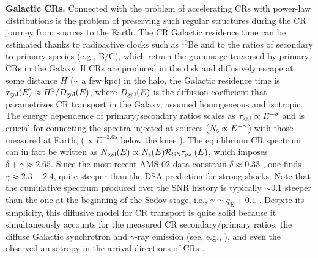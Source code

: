 \documentclass[varenna]{cimento}
\begin{document}
 {\bf Galactic CRs.}
Connected with the problem of accelerating CRs with power-law distributions is the problem of preserving such regular structures during the CR journey from sources to the Earth.
The CR Galactic residence time can be estimated thanks to radioactive clocks such as $^{10}$Be and to the   ratios of secondary to primary species  (e.g.,  B/C), which return the grammage traversed by primary CRs in the Galaxy.
If CRs are produced in the disk and diffusively escape at some distance $H$ ($\sim$\,a few kpc) in the halo, the Galactic residence time is $\tau_{\rm gal}(E)\approx H^2/D_{\rm gal}(E)$, where $D_{\rm gal}(E)$ is the diffusion coefficient that parametrizes CR transport in the Galaxy, assumed homogeneous and isotropic.
The energy dependence of primary/secondary ratios scales as $\tau_{\rm gal}\propto E^{-\delta}$ and is crucial for connecting the spectra injected at sources ($N_{\rm s}\propto E^{-\gamma}$) with those measured at Earth, ($\propto E^{-2.65}$ below the knee \cite{PAMELA14,ams16a}).
The equilibrium CR spectrum can in fact be written as $N_{\rm gal}(E)\propto N_{\rm s}(E) \mathcal{R_{\rm SN}}\tau_{\rm gal}(E)$, which imposes $\delta+\gamma\approx 2.65$.
Since the most recent AMS-02 data constrain $\delta\approx 0.33$  \cite{ams16a,evoli+21}, one finds $\gamma\approx 2.3-2.4$, quite steeper than the DSA prediction for strong shocks.
Note that the cumulative spectrum produced over the SNR history is typically $\sim 0.1$ steeper than the one at the beginning of the Sedov stage, i.e., $\gamma\simeq q_E+0.1$ \cite{caprioli+10a}.
Despite its simplicity, this diffusive model for CR transport is quite solid because it simultaneously accounts for the measured CR secondary/primary ratios, the diffuse Galactic synchrotron and $\gamma$-ray emission (see, e.g., \cite{blasi+11a,strong+98,evoli+19a,evoli+19b,evoli+21}), and even the observed anisotropy in the arrival directions of CRs \cite{blasi+11b}.
\end{document}
